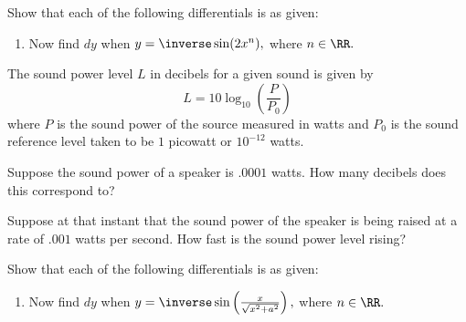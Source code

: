   \begin{ProblemSection}


  \begin{embeddedproblem}{}
    Show that each of the following differentials is as given:
    \begin{enumerate}[label={\bf{}(\alph*)}]
      \hrule{}
    \item Now find $d{y}$ when $y=\inverse\sin(2x^n),$ where $n \in\RR.$
    \end{enumerate}  
  \end{embeddedproblem}

  \begin{embeddedproblem}{}
  The sound power level $L$ in decibels for a given sound is given by 
  $$
  L=10\log_{10}\left(\frac{P}{P_0}\right)
  $$
  where $P$ is the sound power of the source measured in watts and
  $P_0$ is the sound reference level taken to be $1$ picowatt or
  $10^{-12}$ watts.
  
  Suppose the sound power of a speaker is $.0001$ watts.  How many
  decibels does this correspond to?

  Suppose at that instant that the sound power of the speaker is being
  raised at a rate of $.001$ watts per second.  How fast is the sound
  power level rising?
\end{embeddedproblem}

  \begin{embeddedproblem}{}
    Show that each of the following differentials is as given:
    \begin{enumerate}[label={\bf{}(\alph*)}]
      \hrule{}
    \item Now find $d{y}$ when
      $y=\inverse\sin\left(\frac{x}{\sqrt{x^2+a^2}}\right),$ where $n \in\RR.$
    \end{enumerate}
  \end{embeddedproblem}


\end{ProblemSection}
